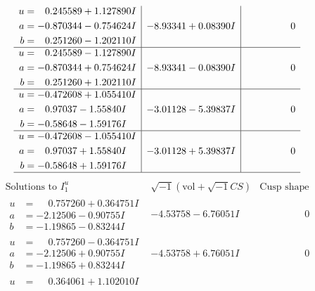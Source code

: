 \documentclass[1p]{elsarticle_modified}
\theoremstyle{definition}
\newcommand{\I}{\sqrt{-1}}
\begin{document}
$$\begin{array}{c|c|c}
\begin{aligned}
u &= \phantom{-}0.245589 + 1.127890 I \\
a &= -0.870344 - 0.754624 I \\
b &= \phantom{-}0.251260 - 1.202110 I\end{aligned}
 & -8.93341 + 0.08390 I & \phantom{-0.000000 } 0 \\ \hline\begin{aligned}
u &= \phantom{-}0.245589 - 1.127890 I \\
a &= -0.870344 + 0.754624 I \\
b &= \phantom{-}0.251260 + 1.202110 I\end{aligned}
 & -8.93341 - 0.08390 I & \phantom{-0.000000 } 0 \\ \hline\begin{aligned}
u &= -0.472608 + 1.055410 I \\
a &= \phantom{-}0.97037 - 1.55840 I \\
b &= -0.58648 - 1.59176 I\end{aligned}
 & -3.01128 - 5.39837 I & \phantom{-0.000000 } 0 \\ \hline\begin{aligned}
u &= -0.472608 - 1.055410 I \\
a &= \phantom{-}0.97037 + 1.55840 I \\
b &= -0.58648 + 1.59176 I\end{aligned}
 & -3.01128 + 5.39837 I & \phantom{-0.000000 } 0\\
 \hline 
 \end{array}$$\newpage$$\begin{array}{c|c|c}  
\text{Solutions to }I^u_{1}& \I (\text{vol} + \sqrt{-1}CS) & \text{Cusp shape}\\
 \hline 
\begin{aligned}
u &= \phantom{-}0.757260 + 0.364751 I \\
a &= -2.12506 - 0.90755 I \\
b &= -1.19865 - 0.83244 I\end{aligned}
 & -4.53758 - 6.76051 I & \phantom{-0.000000 } 0 \\ \hline\begin{aligned}
u &= \phantom{-}0.757260 - 0.364751 I \\
a &= -2.12506 + 0.90755 I \\
b &= -1.19865 + 0.83244 I\end{aligned}
 & -4.53758 + 6.76051 I & \phantom{-0.000000 } 0 \\ \hline\begin{aligned}
u &= \phantom{-}0.364061 + 1.102010 I \\

\end{aligned}
\end{array}$$
\end{document}
